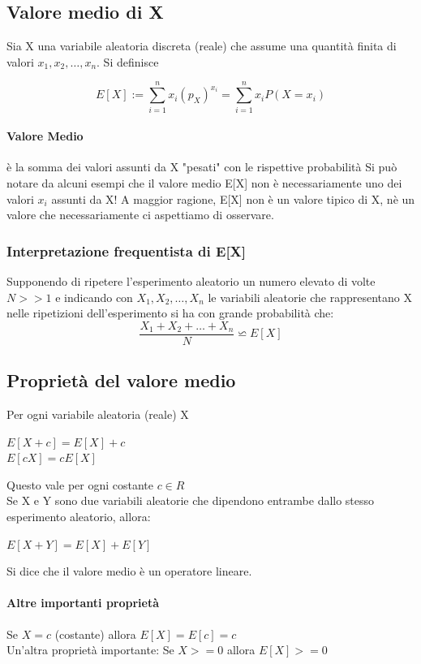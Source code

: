\documentclass[12pt, a4paper, openany]{book}
\begin{document}
\subsection{Valore medio di X}
Sia X una variabile aleatoria discreta (reale) che assume una quantità finita di valori
$x_1, x_2, \dots, x_n$. Si definisce

\begin{equation}
    E[X]:= \sum_{i = 1}^{n} x_i (p_X)^{x_i} = \sum_{i = 1}^{n} x_i P(X= x_i)
\end{equation}
\paragraph{Valore Medio} è la somma dei valori assunti da X "pesati" con le rispettive probabilità
Si può notare da alcuni esempi che il valore medio E[X] non è necessariamente
uno dei valori $x_i$ assunti da X!
A maggior ragione, E[X] non è un valore tipico di X, nè un valore che necessariamente
ci aspettiamo di osservare.
\subsubsection{Interpretazione frequentista di E[X]}
Supponendo di ripetere l'esperimento aleatorio un numero elevato di volte $N >> 1$
e indicando con $X_1, X_2, \dots, X_n$ le variabili aleatorie che rappresentano X nelle
ripetizioni dell'esperimento si ha con grande probabilità che:
\begin{equation}
    \frac{X_1 + X_2 + \dots + X_n}{N} \backsimeq  E[X]
\end{equation}

\subsection{Proprietà del valore medio}
Per ogni variabile aleatoria (reale) X
\begin{center}
    $E[X + c] = E[X] + c$
    \\$E[cX] = c E[X]$
\end{center}
Questo vale per ogni costante $c \in R$
\\ Se X e Y sono due variabili aleatorie che dipendono entrambe dallo
stesso esperimento aleatorio, allora:
\begin{center}
    $E[X+Y] = E[X] + E[Y]$
\end{center}
Si dice che il valore medio è un operatore lineare.
\paragraph{Altre importanti proprietà} Se $X = c$ (costante) allora
$E[X] = E[c] = c$
\\ Un'altra proprietà importante: Se $X >= 0$ allora $E[X] >= 0$
\end{document}
